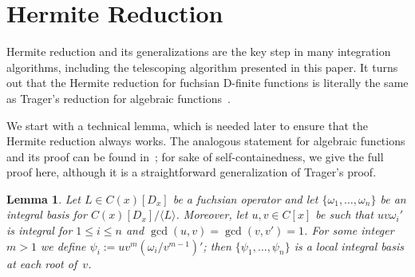 \documentclass{sig-alternate}
\newtheorem{lemma}[theorem]{Lemma}
\def\<#1>{\langle#1\rangle}
\begin{document}
\section{Hermite Reduction}\label{sec:hermite}

Hermite reduction and its generalizations are the key step in many integration
algorithms, including the telescoping algorithm presented in this paper. It
turns out that the Hermite reduction for fuchsian D-finite functions is
literally the same as Trager's reduction for algebraic
functions~\cite{trager84}.

We start with a technical lemma, which is needed later to ensure that the
Hermite reduction always works. The analogous statement for algebraic
functions and its proof can be found in~\cite[pp. 46--47]{trager84}; for
sake of self-containedness, we give the full proof here, although it is a
straightforward generalization of Trager's proof.
\begin{lemma}\label{lemma:ibv}
Let $L\in C(x)[D_x]$ be a fuchsian operator and let
$\{\omega_1,\ldots,\omega_n\}$ be an integral basis for
$C(x)[D_x]/\<L>$. Moreover, let $u,v\in C[x]$ be such that $uv\omega_i'$ is
integral for $1\leq i\leq n$ and $\gcd(u,v)=\gcd(v,v')=1$.  For some integer
$m>1$ we define $\psi_i:=uv^m(\omega_i/v^{m-1})'$; then
$\{\psi_1,\ldots,\psi_n\}$ is a local integral basis at each root of~$v$.
\end{lemma}
\end{document}
